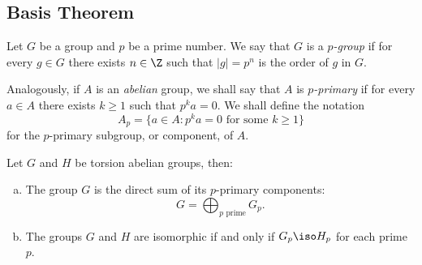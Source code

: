 \subsection{Basis Theorem}

\begin{definition}[\(p\)-group]
    \label{def:p-group}
    Let \(G\) be a group and \(p\) be a prime number. We say that \(G\) is a
    \emph{\(p\)-group} if for every \(g \in G\) there exists \(n \in \Z\) such that
    \(|g| = p^n\) is the order of \(g\) in \(G\).

    Analogously, if \(A\) is an \emph{abelian} group, we shall say that \(A\) is
    \emph{\(p\)-primary} if for every \(a \in A\) there exists \(k \geq 1\) such
    that \(p^k a = 0\). We shall define the notation
    \[
        A_p = \{a \in A \colon p^k a = 0 \text{ for some } k \geq 1\}
    \]
    for the \(p\)-primary subgroup, or component, of \(A\).
\end{definition}

\begin{theorem}
    \label{thm:primary-decomposition-torsion-abelian-grp}
    Let \(G\) and \(H\) be torsion abelian groups, then:
    \begin{enumerate}[(a)]\setlength\itemsep{0em}
        \item The group \(G\) is the direct sum of its \(p\)-primary components:
              \[
                  G = \bigoplus_{p \text{ prime}} G_p.
              \]

        \item The groups \(G\) and \(H\) are isomorphic if and only if \(G_p \iso H_p\)
              for each prime \(p\).
    \end{enumerate}
\end{theorem}

